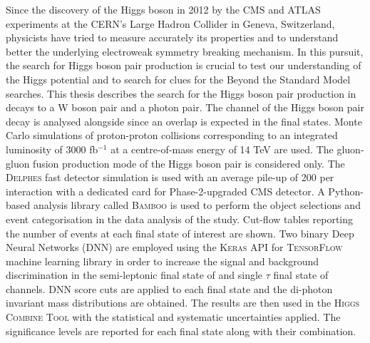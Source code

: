 Since the discovery of the Higgs boson in 2012 by the CMS and ATLAS experiments at the CERN's Large Hadron Collider in Geneva, Switzerland, physicists have tried to measure accurately its properties and to understand better the underlying electroweak symmetry breaking mechanism. In this pursuit, the search for Higgs boson pair production is crucial to test our understanding of the Higgs potential and to search for clues for the Beyond the Standard Model searches. This thesis describes the search for the Higgs boson pair production in decays to a W boson pair and a photon pair. The \ttgg channel of the Higgs boson pair decay is analysed alongside since an overlap is expected in the final states. Monte Carlo simulations of proton-proton collisions corresponding to an integrated luminosity of 3000 fb$^{-1}$ at a centre-of-mass energy of 14 TeV are used. The gluon-gluon fusion production mode of the Higgs boson pair is considered only. The \textsc{Delphes} fast detector simulation is used with an average pile-up of 200 per interaction with a dedicated card for Phase-2-upgraded CMS detector. A Python-based analysis library called \textsc{Bamboo} is used to perform the object selections and event categorisation in the data analysis of the study. Cut-flow tables reporting the number of events at each final state of interest are shown. Two binary Deep Neural Networks (DNN) are employed using the \textsc{Keras} API for \textsc{TensorFlow} machine learning library in order to increase the signal and background discrimination in the semi-leptonic final state of \wwgg and single $\tau$ final state of \ttgg channels. DNN score cuts are applied to each final state and the di-photon invariant mass distributions are obtained. The results are then used in the \textsc{Higgs Combine Tool} with the statistical and systematic uncertainties applied. The significance levels are reported for each final state along with their combination.